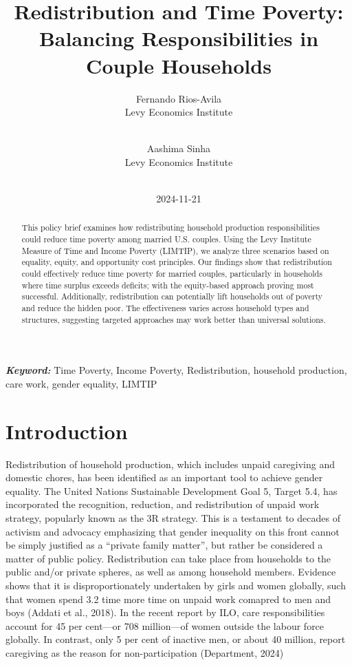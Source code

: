 \documentclass[
  11pt,
]{article}
\title{Redistribution and Time Poverty: Balancing Responsibilities in
Couple Households}
\author{
Fernando Rios-Avila\\
Levy Economics Institute\\
\\
\and 
Aashima Sinha\\
Levy Economics Institute\\
\\
}
\date{2024-11-21}
\begin{document}
\def\spacingset#1{\renewcommand{\baselinestretch}%
{#1}\small\normalsize} \spacingset{1}


\maketitle
\begin{abstract}
This policy brief examines how redistributing household production
responsibilities could reduce time poverty among married U.S. couples.
Using the Levy Institute Measure of Time and Income Poverty (LIMTIP), we
analyze three scenarios based on equality, equity, and opportunity cost
principles. Our findings show that redistribution could effectively
reduce time poverty for married couples, particularly in households
where time surplus exceeds deficits; with the equity-based approach
proving most successful. Additionally, redistribution can potentially
lift households out of poverty and reduce the hidden poor. The
effectiveness varies across household types and structures, suggesting
targeted approaches may work better than universal solutions.
\end{abstract}
 
\vspace{.2in}

\textbf{\textit{Keyword: }}Time Poverty, Income Poverty, Redistribution,
household production, care work, gender equality, LIMTIP


\thispagestyle{empty}
\clearpage{}
\newpage
\spacingset{1.2} %
\section{Introduction}\label{introduction}

Redistribution of household production, which includes unpaid caregiving
and domestic chores, has been identified as an important tool to achieve
gender equality. The United Nations Sustainable Development Goal 5,
Target 5.4, has incorporated the recognition, reduction, and
redistribution of unpaid work strategy, popularly known as the 3R
strategy. This is a testament to decades of activism and advocacy
emphasizing that gender inequality on this front cannot be simply
justified as a ``private family matter'', but rather be considered a
matter of public policy. Redistribution can take place from households
to the public and/or private spheres, as well as among household
members. Evidence shows that it is disproportionately undertaken by
girls and women globally, such that women spend 3.2 time more time on
unpaid work comapred to men and boys (Addati et al., 2018). In the
recent report by ILO, care responsibilities account for 45 per cent---or
708 million---of women outside the labour force globally. In contrast,
only 5 per cent of inactive men, or about 40 million, report caregiving
as the reason for non-participation (Department, 2024)
\end{document}
